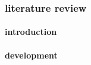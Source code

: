 \documentclass{beamer}
\begin{document}
\begin{frame}
\frametitle{literature review}
\framesubtitle<1>{introduction}
\framesubtitle<2>{development}
\end{frame}
\end{document}
